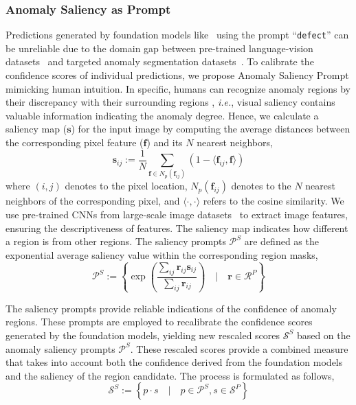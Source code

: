 \subsubsection{Anomaly Saliency as Prompt}
Predictions generated by foundation models like~\cite{liu2023grounding} using the prompt ``\verb|defect|'' can be unreliable due to the domain gap between pre-trained language-vision datasets~\cite{Laion400} and targeted anomaly segmentation datasets~\cite{bergmann2019mvtec,zou2022spot}. To calibrate the confidence scores of individual predictions, we propose Anomaly Saliency Prompt mimicking human intuition. In specific, humans can recognize anomaly regions by their discrepancy with their surrounding regions \cite{aota2023zero}, \textit{i.e.}, visual saliency contains valuable information indicating the anomaly degree. Hence, we calculate a saliency map ($\mathbf{s}$) for the input image by computing the average distances between the corresponding pixel feature ($\mathbf{f}$) and its $N$ nearest neighbors, 
\begin{equation}
\label{eq:saliency-map}
    \mathbf{s}_{ij} := \frac{1}{N}\sum\limits_{\mathbf{f}\in N_p(\mathbf{f}_{ij})}(1-  \langle \mathbf{f}_{ij},\mathbf{f}  \rangle)
\end{equation}
where $(i,j)$ denotes to the pixel location, $N_p(\mathbf{f}_{ij})$ denotes to the $N$ nearest neighbors of the corresponding pixel, and $\langle \cdot, \cdot \rangle$ refers to the cosine similarity. We use pre-trained CNNs from large-scale image datasets~\cite{hinton2012imagenet} to extract image features, ensuring the descriptiveness of features. The saliency map indicates how different a region is from other regions. The saliency prompts $\mathcal{P}^{S}$ are defined as the exponential average saliency value within the corresponding region masks, 
\begin{equation}
\label{eq:score_saliency}
    \mathcal{P}^{S} := \left\{ \exp(\frac{\sum_{i j}\mathbf{r}_{i j}\mathbf{s}_{i j}}{\sum_{i j}\mathbf{r}_{i j}}) \quad | \quad \mathbf{r} \in \mathcal{R}^P \right\}
\end{equation}

The saliency prompts provide reliable indications of the confidence of anomaly regions. These prompts are employed to recalibrate the confidence scores generated by the foundation models, yielding new rescaled scores $\mathcal{S}^{S}$ based on the anomaly saliency prompts $\mathcal{P}^{S}$. These rescaled scores provide a combined measure that takes into account both the confidence derived from the foundation models and the saliency of the region candidate. The process is formulated as follows,
\begin{equation}
\label{eq:rescore}
    \mathcal{S}^{S} := \left\{ p \cdot s  \quad | \quad   p \in \mathcal{P}^{S},   s \in \mathcal{S}^P \right\}
\end{equation}

